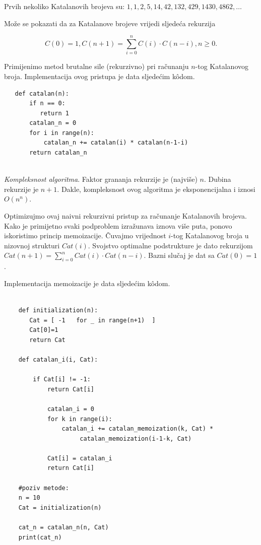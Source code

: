  Prvih nekoliko Katalanovih brojeva su: $1, 1, 2, 5, 14, 42, 132,
 429, 1430, 4862, \ldots $
 
 
 Može se pokazati da za Katalanove brojeve vrijedi sljedeća rekurzija
 
 $$C(0) = 1, C(n+1) = \sum_{i=0}^{n} C(i) \cdot C(n-i), n \geq  0.$$
 
 Primijenimo metod brutalne sile (rekurzivno) pri računanju $n$-tog Kata\-lanovog broja. Implementacija ovog pristupa je data sljedećim k\^odom. 
 
 \begin{verbatim}
   def catalan(n):
       if n == 0:
          return 1
       catalan_n = 0 
       for i in range(n): 
           catalan_n += catalan(i) * catalan(n-1-i) 
       return catalan_n
        
 \end{verbatim}
  
  \emph{Kompleksnost algoritma}. Faktor grananja rekurzije je (najviše) $n$. Dubi\-na rekurzije je $n+1$. Dakle, kompleksnost ovog algoritma je eksponencijalna i iznosi $O(n^n)$. 

Optimizujmo ovaj naivni rekurzivni pristup za računanje Katalanovih brojeva. Kako je primijetno svaki podproblem izražunava iznova više puta, ponovo iskoristimo princip memoizacije. Čuvajmo vrijednost $i$-tog Katalano\-vog broja u nizovnoj strukturi $Cat(i)$.  Svojstvo optimalne podstrukture je dato rekurzijom $Cat(n+1) = \sum_{i=0}^{n} Cat(i) \cdot Cat(n-i).$ Bazni slučaj je dat sa $Cat(0) =1$.

Implementacija memoizacije je data sljedećim k\^odom.

  \begin{verbatim}
	
	def initialization(n):
	   Cat = [ -1   for _ in range(n+1)  ] 
	   Cat[0]=1
	   return Cat 
	
	def catalan_i(i, Cat): 
	
	    if Cat[i] != -1:
	        return Cat[i]
     
            catalan_i = 0
            for k in range(i): 
                catalan_i += catalan_memoization(k, Cat) *
                     catalan_memoization(i-1-k, Cat)
    
            Cat[i] = catalan_i
            return Cat[i]
    
	#poziv metode:
	n = 10
	Cat = initialization(n) 
	
	cat_n = catalan_n(n, Cat) 
	print(cat_n)
\end{verbatim}  

